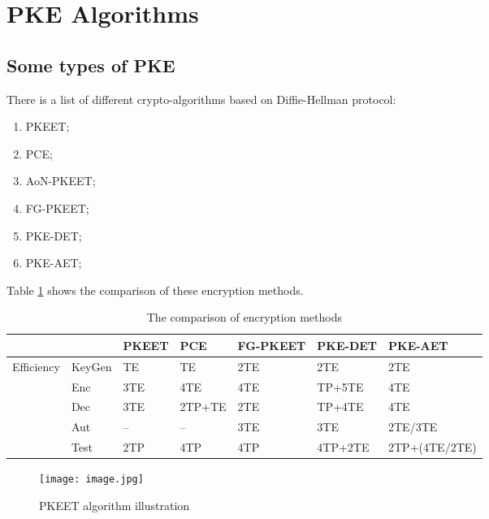 \documentclass[12pt]{article}
\begin{document}
\tableofcontents
\newpage
\section{PKE Algorithms}
\subsection{Some types of PKE} 



There is a list of different crypto-algorithms based on Diffie-Hellman protocol:
\newline
\begin{enumerate}
    \item PKEET;
    \item PCE;
    \item AoN-PKEET;
    \item FG-PKEET;
    \item PKE-DET;
    \item PKE-AET;
\end{enumerate}
Table \ref{table 1}  shows the comparison of these encryption methods.
\newline
\begin{table}[h!]
    \begin{center}
        \caption{The comparison of encryption methods}
        \label{table 1}
          \begin{tabular}{|p{1.75cm}|p{2.625cm}|p{1.75cm}|p{1.75cm}|p{1.75cm}|p{1.75cm}|p{3cm}|}
          \hline
            & &PKEET&PCE&FG-PKEET&PKE-DET&PKE-AET\\
          \hline
          Efficiency&KeyGen&TE&TE&2TE&2TE&2TE\\
          \hline
          &Enc&3TE&4TE&4TE&TP+5TE&4TE\\
          \hline
          &Dec&3TE&2TP+TE&2TE&TP+4TE&4TE\\
          \hline
           &Aut& – & – &3TE&3TE&2TE/3TE\\
          \hline
           &Test&2TP&4TP&4TP&4TP+2TE&2TP+(4TE/2TE)\\
           \hline
          \end{tabular}
   \end{center}
\end{table}




\begin{figure}[H]
    \centering
    \texttt{[image: image.jpg]}
    \caption{PKEET algorithm illustration}
    \label{figure1}
\end{figure}
\end{document}
